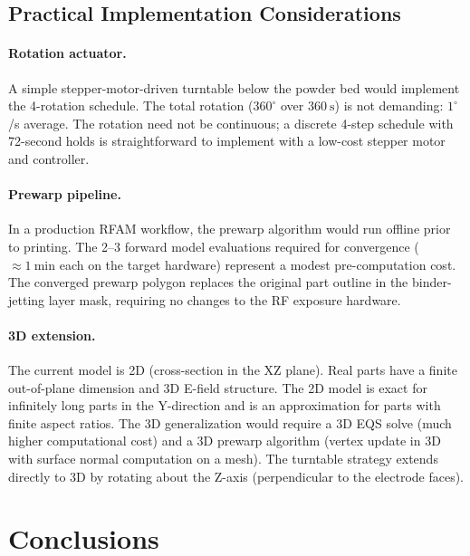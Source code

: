 \documentclass[5p,times]{elsarticle}
\begin{document}
\subsection{Practical Implementation Considerations}

\paragraph{Rotation actuator.}
A simple stepper-motor-driven turntable below the powder bed would
implement the 4-rotation schedule.  The total rotation ($360^\circ$
over $\SI{360}{\second}$) is not demanding: $1^\circ$/s average.  The
rotation need not be continuous; a discrete 4-step schedule with
72-second holds is straightforward to implement with a low-cost
stepper motor and controller.

\paragraph{Prewarp pipeline.}
In a production RFAM workflow, the prewarp algorithm would run
offline prior to printing.  The 2--3 forward model evaluations required
for convergence ($\approx\SI{1}{\minute}$ each on the target hardware)
represent a modest pre-computation cost.  The converged prewarp polygon
replaces the original part outline in the binder-jetting layer mask,
requiring no changes to the RF exposure hardware.

\paragraph{3D extension.}
The current model is 2D (cross-section in the XZ plane).  Real parts
have a finite out-of-plane dimension and 3D E-field structure.  The
2D model is exact for infinitely long parts in the Y-direction and is
an approximation for parts with finite aspect ratios.  The 3D
generalization would require a 3D EQS solve (much higher computational
cost) and a 3D prewarp algorithm (vertex update in 3D with surface
normal computation on a mesh).  The turntable strategy extends directly
to 3D by rotating about the Z-axis (perpendicular to the electrode
faces).

\FloatBarrier
\section{Conclusions}
\label{sec:conclusions}
\end{document}

